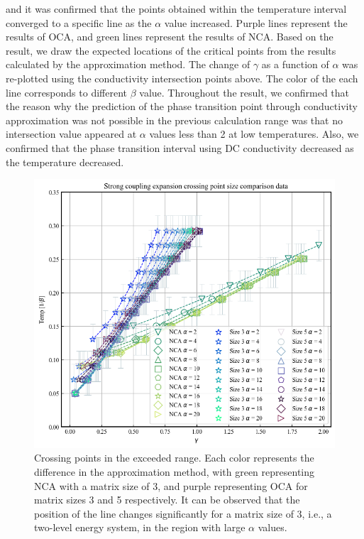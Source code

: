 \documentclass{article}[12pt]
\begin{document}
\begin{spacing}{1.5}
and it was confirmed that the points obtained within the temperature interval converged to a specific line as the $\alpha$ value increased. 
Purple lines represent the results of OCA, and green lines represent the results of NCA. 
Based on the result, we draw the expected locations of the critical points from the results calculated by the approximation method. 
The change of $\gamma$ as a function of $\alpha$ was re-plotted using the conductivity intersection points above. 
The color of the each line corresponds to different $\beta$ value.
Throughout the result, we confirmed that the reason why the prediction of the phase transition point through conductivity approximation was not possible 
in the previous calculation range was that no intersection value appeared at $\alpha$ values less than 2 at low temperatures. 
Also, we confirmed that the phase transition interval using DC conductivity decreased as the temperature decreased.
\pagebreak
\begin{figure}[H]
  \centerline{\includegraphics[width=12cm]{TexFigure/output.png}}
  \caption{Crossing points in the exceeded range. Each color represents the difference in the approximation method, 
  with green representing NCA with a matrix size of 3,  and purple representing OCA for matrix sizes 3 and 5 respectively. 
  It can be observed that the position of the line changes significantly for a matrix size of 3, i.e., a two-level energy system, 
  in the region with large $\alpha$ values.}
\end{figure}
\begin{figure}[htbp]

\end{figure}
\end{spacing}
\end{document}
